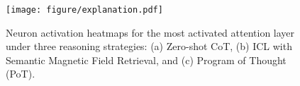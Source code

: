 \begin{figure}[t]
    \centering
    \texttt{[image: figure/explanation.pdf]}
    \caption{Neuron activation heatmaps for the most activated attention layer under three reasoning strategies: (a) Zero-shot CoT, (b) ICL with Semantic Magnetic Field Retrieval, and (c) Program of Thought (PoT).}\label{fig:explanation}
\end{figure}

